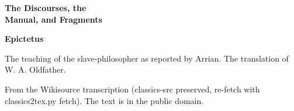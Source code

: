 \documentclass[11pt,letterpaper]{article}
\begin{document}
\color{ink}

\begin{titlepage}
\centering
\vspace*{4em}
{\LARGE\bfseries\color{heading} The Discourses, the\\[0.3em]Manual, and Fragments\par}
\vspace{2em}
{\Large\bfseries\color{heading} Epictetus\par}
\vspace{2.5em}
{\itshape\color{subhead}\parbox{0.8\linewidth}{\centering The teaching of the slave-philosopher as reported by Arrian. The translation of W. A. Oldfather.\par}}
\vfill
{\small From the Wikisource transcription (classics-src preserved, re-fetch with classics2tex.py fetch). The text is in the public domain.\par}
\vspace{2em}
\end{titlepage}

\tableofcontents


\end{document}
